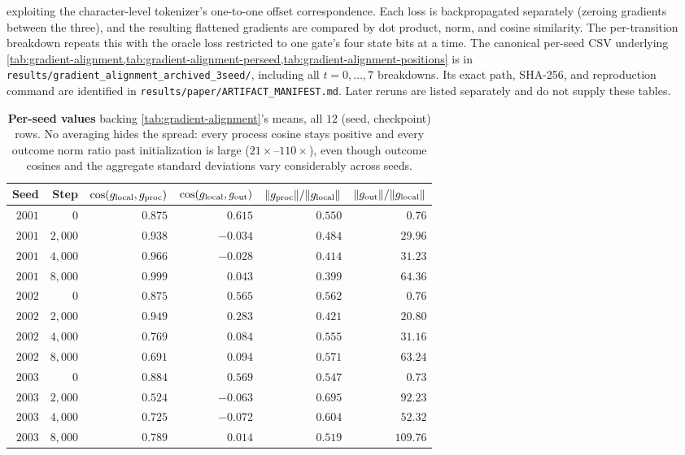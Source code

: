 exploiting the character-level tokenizer's one-to-one offset
correspondence. Each loss is backpropagated separately (zeroing gradients
between the three), and the resulting flattened gradients are compared by
dot product, norm, and cosine similarity. The per-transition breakdown
repeats this with the oracle loss restricted to one gate's four state bits
at a time. The canonical per-seed CSV underlying
\cref{tab:gradient-alignment,tab:gradient-alignment-perseed,tab:gradient-alignment-positions}
is in \texttt{results/gradient\_alignment\_archived\_3seed/}, including all
$t=0,\ldots,7$ breakdowns. Its exact path, SHA-256, and reproduction
command are identified in \texttt{results/paper/ARTIFACT\_MANIFEST.md}.
Later reruns are listed separately and do not supply these tables.

\begin{table}[htbp]
\centering
\small
\begin{tabular}{rrrrrr}
\toprule
Seed & Step & $\cos(g_{\rm local},g_{\rm proc})$ & $\cos(g_{\rm local},g_{\rm out})$ &
$\|g_{\rm proc}\|/\|g_{\rm local}\|$ & $\|g_{\rm out}\|/\|g_{\rm local}\|$\\
\midrule
$2001$ & $0$ & $0.875$ & $0.615$ & $0.550$ & $0.76$\\
$2001$ & $2{,}000$ & $0.938$ & $-0.034$ & $0.484$ & $29.96$\\
$2001$ & $4{,}000$ & $0.966$ & $-0.028$ & $0.414$ & $31.23$\\
$2001$ & $8{,}000$ & $0.999$ & $0.043$ & $0.399$ & $64.36$\\
$2002$ & $0$ & $0.875$ & $0.565$ & $0.562$ & $0.76$\\
$2002$ & $2{,}000$ & $0.949$ & $0.283$ & $0.421$ & $20.80$\\
$2002$ & $4{,}000$ & $0.769$ & $0.084$ & $0.555$ & $31.16$\\
$2002$ & $8{,}000$ & $0.691$ & $0.094$ & $0.571$ & $63.24$\\
$2003$ & $0$ & $0.884$ & $0.569$ & $0.547$ & $0.73$\\
$2003$ & $2{,}000$ & $0.524$ & $-0.063$ & $0.695$ & $92.23$\\
$2003$ & $4{,}000$ & $0.725$ & $-0.072$ & $0.604$ & $52.32$\\
$2003$ & $8{,}000$ & $0.789$ & $0.014$ & $0.519$ & $109.76$\\
\bottomrule
\end{tabular}
\caption{\textbf{Per-seed values} backing \cref{tab:gradient-alignment}'s
means, all $12$ (seed, checkpoint) rows. No averaging hides the spread:
every process cosine stays positive and every outcome norm ratio past
initialization is large ($21\times$--$110\times$), even though outcome
cosines and the aggregate standard deviations vary considerably across
seeds.}
\label{tab:gradient-alignment-perseed}
\end{table}

